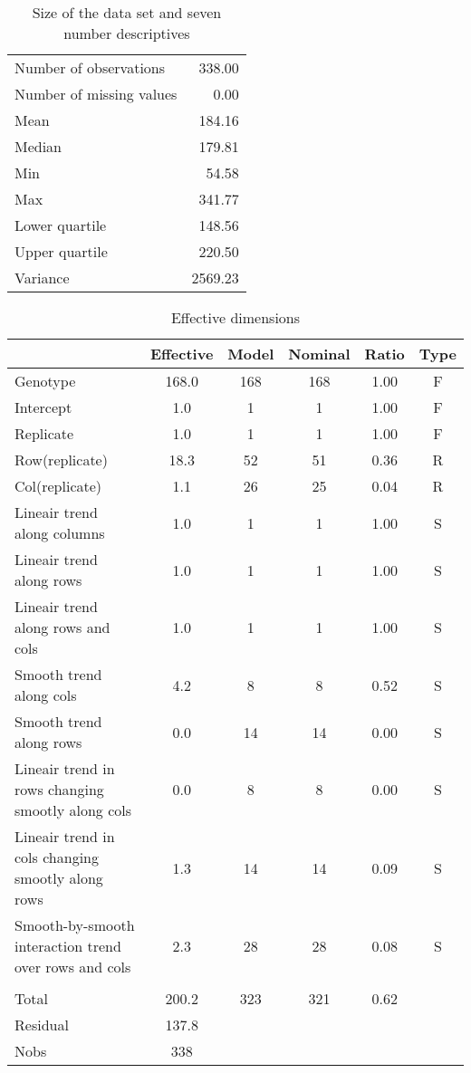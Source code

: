 \documentclass[a4paper,11pt]{article}\usepackage[]{graphicx}\usepackage[]{color}
\begin{document}
\begin{table}[ht]
\begin{flushleft}
\caption{Size of the data set and seven number descriptives} 
\label{modelSummary}
\begin{tabular}{lr}
  \hline
  \hline
Number of observations & 338.00 \\ 
  Number of missing values & 0.00 \\ 
  Mean & 184.16 \\ 
  Median & 179.81 \\ 
  Min & 54.58 \\ 
  Max & 341.77 \\ 
  Lower quartile & 148.56 \\ 
  Upper quartile & 220.50 \\ 
  Variance & 2569.23 \\ 
   \hline
\end{tabular}
\end{flushleft}
\end{table}
\begin{table}[ht]
\begin{flushleft}
\caption{Effective dimensions} 
\label{effDims}
\begin{tabular}{lccccc}
  \hline
 & Effective & Model & Nominal & Ratio & Type \\ 
  \hline
Genotype & 168.0 & 168 & 168 & 1.00 & F \\ 
  Intercept & 1.0 & 1 & 1 & 1.00 & F \\ 
  Replicate & 1.0 & 1 & 1 & 1.00 & F \\ 
  Row(replicate) & 18.3 & 52 & 51 & 0.36 & R \\ 
  Col(replicate) & 1.1 & 26 & 25 & 0.04 & R \\ 
  Lineair trend along columns & 1.0 & 1 & 1 & 1.00 & S \\ 
  Lineair trend along rows & 1.0 & 1 & 1 & 1.00 & S \\ 
  Lineair trend along rows and cols & 1.0 & 1 & 1 & 1.00 & S \\ 
  Smooth trend along cols & 4.2 & 8 & 8 & 0.52 & S \\ 
  Smooth trend along rows & 0.0 & 14 & 14 & 0.00 & S \\ 
  Lineair trend in rows changing smootly along cols & 0.0 & 8 & 8 & 0.00 & S \\ 
  Lineair trend in cols changing smootly along rows & 1.3 & 14 & 14 & 0.09 & S \\ 
  Smooth-by-smooth interaction trend over rows and cols & 2.3 & 28 & 28 & 0.08 & S \\ 
   &  &  &  &  &  \\ 
  Total & 200.2 & 323 & 321 & 0.62 &  \\ 
  Residual & 137.8 &  &  &  &  \\ 
  Nobs & 338 &  &  &  &  \\ 
   \hline
\end{tabular}
\end{flushleft}
\end{table}
\end{document}
